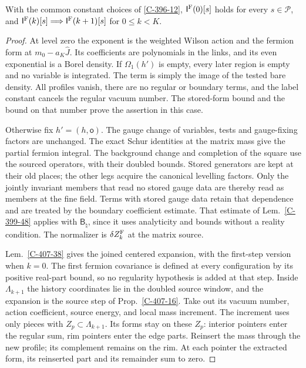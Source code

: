 \documentclass[11pt,letterpaper,reqno]{amsart}
\makeatletter
\theoremstyle{definition}
\newcommand{\ms@minorstart}{%
  \pushQED{\qed}\renewcommand{\qedsymbol}{$\blacksquare$}}
\newenvironment{proposition}[1][]{\ms@minorstart\ms@proposition[#1]}
  {\popQED\endms@proposition}
\theoremstyle{remark}
\makeatother
\begin{document}
\begin{proposition}[Induction at a complex source]\label{C-407-37}
With the common constant choices of \cref{C-396-12},
$\mathsf I^{\rm F}(0)[s]$ holds for
every $s\in\mathcal P$, and
$\mathsf I^{\rm F}(k)[s]\Longrightarrow
\mathsf I^{\rm F}(k+1)[s]$ for $0\le k<K$.
\end{proposition}
\begin{proof}
At level zero the exponent is the weighted Wilson action and
the fermion form at $m_0-a_K\widehat J$. Its coefficients are
polynomials in the links, and its even exponential is a Borel
density. If $\Omega_1(h')$ is empty, every later region is empty
and no variable is integrated. The term is simply the image of
the tested bare density. All profiles vanish, there are no
regular or boundary terms, and the label constant cancels the
regular vacuum number. The stored-form bound and the bound on
that number prove the assertion in this case.

Otherwise fix $h'=(h,\mathsf o)$. The gauge change of variables,
tests and gauge-fixing factors are unchanged. The exact Schur
identities at the matrix mass give the partial fermion integral.
The background change and completion of the square use the
sourced operators, with their doubled bounds. Stored generators
are kept at their old places; the other legs acquire the
canonical levelling factors.  Only the jointly invariant members
that read no stored gauge data are thereby read as members at the
fine field.  Terms with stored gauge data retain that dependence
and are treated by the boundary coefficient estimate.  That estimate
of Lem.~\ref{C-399-48} applies with $\mathsf B_\natural$,
since it uses analyticity and bounds without a reality condition.
The normalizer is $\delta Z_k^{\rm F}$ at the matrix source.

Lem.~\ref{C-407-38} gives the joined centered expansion, with
the first-step version when $k=0$. The first fermion covariance
is defined at every configuration by its positive real-part
bound, so no regularity hypothesis is added at that step.
Inside $\Lambda_{k+1}$ the history coordinates lie in the
doubled source window, and the expansion is the source step of
Prop.~\ref{C-407-16}. Take out its vacuum number, action
coefficient, source energy, and local mass increment. The
increment uses only pieces with $Z_p\subset\Lambda_{k+1}$.
Its forms stay on these $Z_p$: interior pointers enter the
regular sum, rim pointers enter the edge parts. Reinsert the
mass through the new profile; its complement remains on the
rim. At each pointer the extracted form, its reinserted part
and its remainder sum to zero.


\end{proof}
\end{document}
